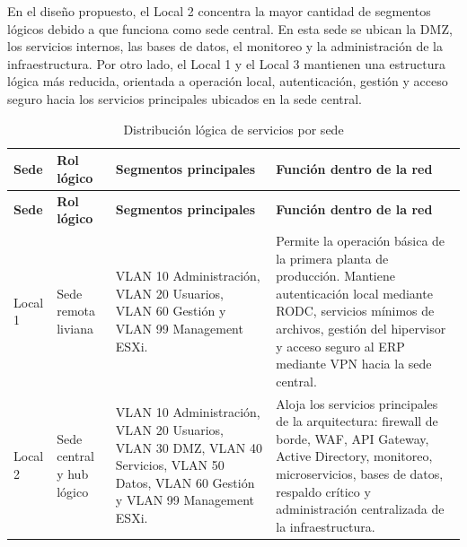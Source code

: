 \documentclass[11pt, a4paper, oneside]{report}
\begin{document}
En el diseño propuesto, el Local 2 concentra la mayor cantidad de segmentos lógicos debido a que funciona como sede central. En esta sede se ubican la DMZ, los servicios internos, las bases de datos, el monitoreo y la administración de la infraestructura. Por otro lado, el Local 1 y el Local 3 mantienen una estructura lógica más reducida, orientada a operación local, autenticación, gestión y acceso seguro hacia los servicios principales ubicados en la sede central.

\renewcommand{\arraystretch}{1.3}
\footnotesize
{}

\begin{xltabular}{\textwidth}{@{}|L{2.4cm}|L{3.1cm}|X|X|@{}}
\caption{Distribución lógica de servicios por sede}
\label{tab:topologia_logica_sedes} \\

\parbox[c][1.1cm][c]{\linewidth}{\centering\color{white}\bfseries\small Sede} &
\parbox[c][1.1cm][c]{\linewidth}{\centering\color{white}\bfseries\small Rol lógico} &
\parbox[c][1.1cm][c]{\linewidth}{\centering\color{white}\bfseries\small Segmentos principales} &
\parbox[c][1.1cm][c]{\linewidth}{\centering\color{white}\bfseries\small Función dentro de la red} \\ \hline
\endfirsthead

\parbox[c][1.1cm][c]{\linewidth}{\centering\color{white}\bfseries\small Sede} &
\parbox[c][1.1cm][c]{\linewidth}{\centering\color{white}\bfseries\small Rol lógico} &
\parbox[c][1.1cm][c]{\linewidth}{\centering\color{white}\bfseries\small Segmentos principales} &
\parbox[c][1.1cm][c]{\linewidth}{\centering\color{white}\bfseries\small Función dentro de la red} \\ \hline
\endhead

\hline
\endfoot

{\small Local 1} &
{\small Sede remota liviana} &
{\small VLAN 10 Administración, VLAN 20 Usuarios, VLAN 60 Gestión y VLAN 99 Management ESXi.} &
{\small Permite la operación básica de la primera planta de producción. Mantiene autenticación local mediante RODC, servicios mínimos de archivos, gestión del hipervisor y acceso seguro al ERP mediante VPN hacia la sede central.} \\ \hline

{\small Local 2} &
{\small Sede central y hub lógico} &
{\small VLAN 10 Administración, VLAN 20 Usuarios, VLAN 30 DMZ, VLAN 40 Servicios, VLAN 50 Datos, VLAN 60 Gestión y VLAN 99 Management ESXi.} &
{\small Aloja los servicios principales de la arquitectura: firewall de borde, WAF, API Gateway, Active Directory, monitoreo, microservicios, bases de datos, respaldo crítico y administración centralizada de la infraestructura.} \\ \hline


\end{xltabular}
\end{document}
